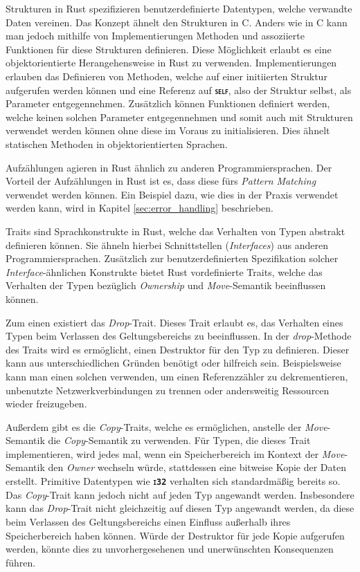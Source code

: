 Strukturen in Rust spezifizieren benutzerdefinierte Datentypen, welche verwandte Daten vereinen. Das Konzept
ähnelt den Strukturen in C. Anders wie in C kann man jedoch mithilfe von Implementierungen Methoden und assoziierte
Funktionen für diese Strukturen definieren.
Diese Möglichkeit erlaubt es eine objektorientierte Herangehensweise in Rust zu verwenden.
Implementierungen erlauben das Definieren von Methoden, welche auf einer initiierten Struktur aufgerufen werden 
können und eine Referenz auf \texttt{\textsc{\textbf{self}}}, also der Struktur selbst, als Parameter entgegennehmen.
Zusätzlich können Funktionen definiert werden, welche keinen solchen Parameter entgegennehmen und somit auch mit
Strukturen verwendet werden können ohne diese im Voraus zu initialisieren.
Dies ähnelt statischen Methoden in objektorientierten Sprachen.\cite{rustBook}

Aufzählungen agieren in Rust ähnlich zu anderen Programmiersprachen. Der Vorteil der Aufzählungen in Rust ist es,
dass diese fürs \textit{Pattern Matching} verwendet werden können.
Ein Beispiel dazu, wie dies in der Praxis verwendet
werden kann, wird in Kapitel \ref{sec:error_handling} beschrieben.
\cite{rustBook}

Traits sind Sprachkonstrukte in Rust, welche das Verhalten von Typen abstrakt definieren können. Sie ähneln 
hierbei Schnittstellen (\textit{Interfaces}) aus anderen Programmiersprachen.
Zusätzlich zur benutzerdefinierten Spezifikation
solcher \textit{Interface}-ähnlichen Konstrukte bietet Rust vordefinierte Traits, welche das Verhalten der Typen
bezüglich \textit{Ownership} und \textit{Move}-Semantik beeinflussen können.\cite{rustBook}

Zum einen existiert das \textit{Drop}-Trait. Dieses Trait erlaubt es, das Verhalten eines Typen beim Verlassen des
Geltungsbereichs zu beeinflussen. In der \textit{drop}-Methode des Traits wird es ermöglicht, einen Destruktor
für den Typ zu definieren. Dieser kann aus unterschiedlichen Gründen benötigt oder hilfreich sein.
Beispielsweise kann man einen solchen verwenden, 
um einen Referenzzähler zu dekrementieren, unbenutzte Netzwerkverbindungen
zu trennen oder andersweitig Ressourcen wieder freizugeben.\cite{rustBook}

Außerdem gibt es die \textit{Copy}-Traits, welche es ermöglichen, anstelle der \textit{Move}-Semantik die
\textit{Copy}-Semantik zu verwenden. Für Typen, die dieses Trait implementieren, wird jedes mal, wenn ein
Speicherbereich im Kontext der \textit{Move}-Semantik den \textit{Owner} wechseln würde,
stattdessen eine bitweise Kopie der Daten erstellt. Primitive Datentypen wie \texttt{\textsc{\textbf{i32}}}
verhalten sich standardmäßig bereits so. Das \textit{Copy}-Trait kann jedoch nicht auf jeden Typ
angewandt werden. Insbesondere kann das \textit{Drop}-Trait nicht gleichzeitig auf diesen Typ angewandt werden,
da diese beim Verlassen des Geltungsbereichs einen Einfluss außerhalb ihres Speicherbereich haben können.
Würde der Destruktor für jede Kopie aufgerufen werden, könnte dies zu unvorhergesehenen und
unerwünschten Konsequenzen führen.\cite{rustBook}\cite{rustDocCopy}

